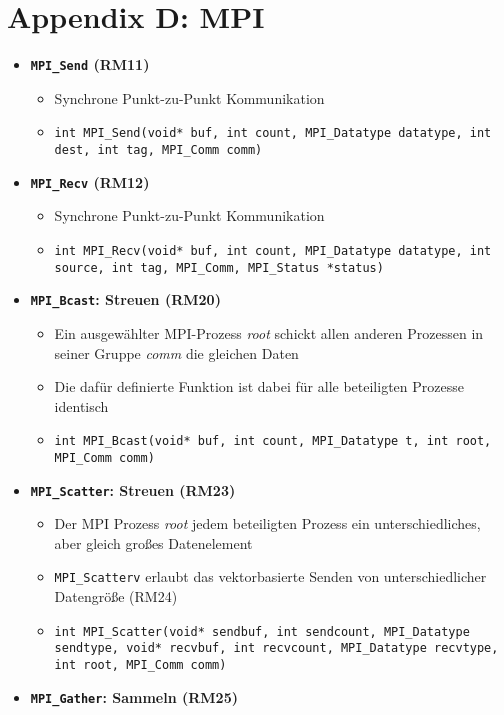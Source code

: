 \section{Appendix D: MPI}
\begin{itemize}
	\item \textbf{\texttt{MPI\_Send} (RM11)}
	\begin{itemize}
		\item Synchrone Punkt-zu-Punkt Kommunikation
		\item \texttt{int MPI\_Send(void* buf, int count, MPI\_Datatype datatype, int dest, int tag, MPI\_Comm comm)}
	\end{itemize}
	\item \textbf{\texttt{MPI\_Recv} (RM12)}
	\begin{itemize}
		\item Synchrone Punkt-zu-Punkt Kommunikation
		\item \texttt{int MPI\_Recv(void* buf, int count, MPI\_Datatype datatype, int source, int tag, MPI\_Comm, MPI\_Status *status)}
	\end{itemize}
	\item \textbf{\texttt{MPI\_Bcast}: Streuen (RM20)}
	\begin{itemize}
		\item Ein ausgewählter MPI-Prozess \textit{root} schickt allen anderen Prozessen in seiner Gruppe \textit{comm} die gleichen Daten
		\item Die dafür definierte Funktion ist dabei für alle beteiligten Prozesse identisch
		\item \texttt{int MPI\_Bcast(void* buf, int count, MPI\_Datatype t, int root, MPI\_Comm comm)}
	\end{itemize}
	\item \textbf{\texttt{MPI\_Scatter}: Streuen (RM23)}
	\begin{itemize}
		\item Der MPI Prozess \textit{root} jedem beteiligten Prozess ein unterschiedliches, aber gleich großes Datenelement
		\item \texttt{MPI\_Scatterv} erlaubt das vektorbasierte Senden von unterschiedlicher Datengröße (RM24)
		\item \texttt{int MPI\_Scatter(void* sendbuf, int sendcount, MPI\_Datatype sendtype, void* recvbuf, int recvcount, MPI\_Datatype recvtype, int root, MPI\_Comm comm)}
	\end{itemize}
	\item \textbf{\texttt{MPI\_Gather}: Sammeln (RM25)}
	\begin{itemize}

\end{itemize}
\end{itemize}
